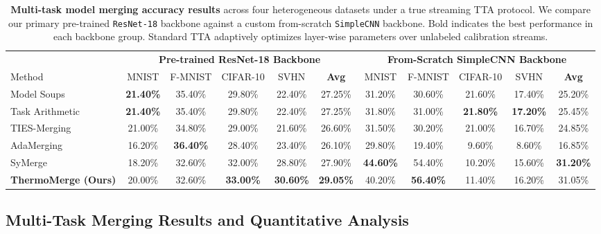 \begin{table}[t]
\centering
\caption{\textbf{Multi-task model merging accuracy results} across four heterogeneous datasets under a true streaming TTA protocol. We compare our primary pre-trained \texttt{ResNet-18} backbone against a custom from-scratch \texttt{SimpleCNN} backbone. Bold indicates the best performance in each backbone group. Standard TTA adaptively optimizes layer-wise parameters over unlabeled calibration streams.}
\label{tab:merging_results}
\vskip 0.15in
\begin{scriptsize}
\begin{sc}
\begin{tabular}{lcccccccccc}
\toprule
& \multicolumn{5}{c}{\textbf{Pre-trained ResNet-18 Backbone}} & \multicolumn{5}{c}{\textbf{From-Scratch SimpleCNN Backbone}} \\
\cmidrule(r){2-6} \cmidrule(l){7-11}
Method & MNIST & F-MNIST & CIFAR-10 & SVHN & \textbf{Avg} & MNIST & F-MNIST & CIFAR-10 & SVHN & \textbf{Avg} \\
\midrule
Model Soups     & \textbf{21.40\%} & 35.40\% & 29.80\% & 22.40\% & 27.25\% & 31.20\% & 30.60\% & 21.60\% & 17.40\% & 25.20\% \\
Task Arithmetic & \textbf{21.40\%} & 35.40\% & 29.80\% & 22.40\% & 27.25\% & 31.80\% & 31.00\% & \textbf{21.80\%} & \textbf{17.20\%} & 25.45\% \\
TIES-Merging    & 21.00\% & 34.80\% & 29.00\% & 21.60\% & 26.60\% & 31.50\% & 30.20\% & 21.00\% & 16.70\% & 24.85\% \\
AdaMerging      & 16.20\% & \textbf{36.40\%} & 28.40\% & 23.40\% & 26.10\% & 29.80\% & 19.40\% &  9.60\% &  8.60\% & 16.85\% \\
SyMerge         & 18.20\% & 32.60\% & 32.00\% & 28.80\% & 27.90\% & \textbf{44.60\%} & 54.40\% & 10.20\% & 15.60\% & \textbf{31.20\%} \\
\textbf{ThermoMerge (Ours)} & 20.00\% & 32.60\% & \textbf{33.00\%} & \textbf{30.60\%} & \textbf{29.05\%} & 40.20\% & \textbf{56.40\%} & 11.40\% & 16.20\% & 31.05\% \\
\bottomrule
\end{tabular}
\end{sc}
\end{scriptsize}
\vskip 0.1in
\end{table}

\subsection{Multi-Task Merging Results and Quantitative Analysis}

